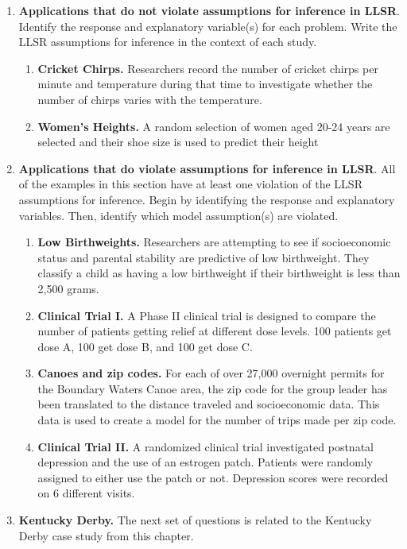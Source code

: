 \documentclass[
]{krantz}
\providecommand{\tightlist}{%
  \setlength{\itemsep}{0pt}\setlength{\parskip}{0pt}}
\begin{document}
\begin{enumerate}
\def\labelenumi{\arabic{enumi}.}
\item
  \textbf{Applications that do not violate assumptions for inference in LLSR}. Identify the response and explanatory variable(s) for each problem. Write the LLSR assumptions for inference in the context of each study.

  \begin{enumerate}
  \def\labelenumii{\alph{enumii}.}
  \tightlist
  \item
    \textbf{Cricket Chirps.} Researchers record the number of cricket chirps per minute and temperature during that time to investigate whether the number of chirps varies with the temperature.
  \item
    \textbf{Women's Heights.} A random selection of women aged 20-24 years are selected and their shoe size is used to predict their height\\
  \end{enumerate}
\item
  \textbf{Applications that do violate assumptions for inference in LLSR}. All of the examples in this section have at least one violation of the LLSR assumptions for inference. Begin by identifying the response and explanatory variables. Then, identify which model assumption(s) are violated.

  \begin{enumerate}
  \def\labelenumii{\alph{enumii}.}
  \tightlist
  \item
    \textbf{Low Birthweights.} Researchers are attempting to see if socioeconomic status and parental stability are predictive of low birthweight. They classify a child as having a low birthweight if their birthweight is less than 2,500 grams.
  \item
    \textbf{Clinical Trial I.} A Phase II clinical trial is designed to compare the number of patients getting relief at different dose levels. 100 patients get dose A, 100 get dose B, and 100 get dose C.
  \item
    \textbf{Canoes and zip codes.} For each of over 27,000 overnight permits for the Boundary Waters Canoe area, the zip code for the group leader has been translated to the distance traveled and socioeconomic data. This data is used to create a model for the number of trips made per zip code.
  \item
    \textbf{Clinical Trial II.} A randomized clinical trial investigated postnatal depression and the use of an estrogen patch. Patients were randomly assigned to either use the patch or not. Depression scores were recorded on 6 different visits.
  \end{enumerate}
\item
  \textbf{Kentucky Derby.} The next set of questions is related to the Kentucky Derby case study from this chapter.


\end{enumerate}
\end{document}
